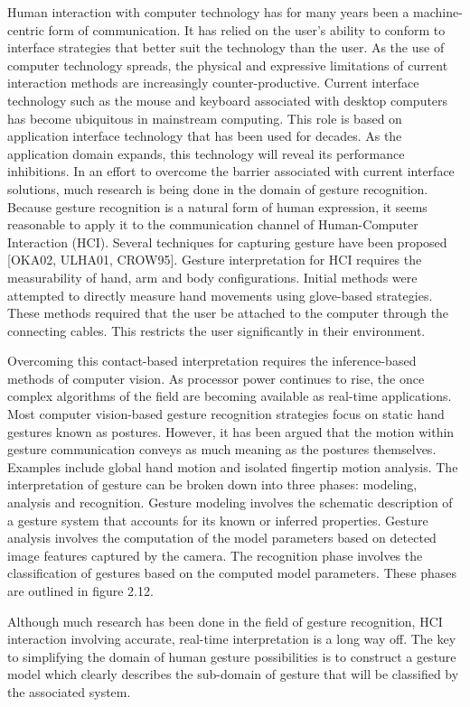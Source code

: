 Human interaction with computer technology has for many years been a machine-centric form of communication. It has relied on the user’s ability to conform to interface strategies that better suit the technology than the user. As the use of computer technology spreads, the physical and expressive limitations of current interaction methods are increasingly counter-productive. Current interface technology such as the mouse and keyboard associated with desktop computers has become ubiquitous in mainstream computing. This role is based on application interface technology that has been used for decades. As the application domain expands, this technology will reveal its performance inhibitions. In an effort to overcome the barrier associated with current interface solutions, much research is being done in the domain of gesture recognition. Because gesture recognition is a natural form of human expression, it seems reasonable to apply it to the communication channel of Human-Computer Interaction (HCI). Several techniques for capturing gesture have been proposed [OKA02, ULHA01, CROW95]. Gesture interpretation for HCI requires the measurability of hand, arm and body configurations. Initial methods were attempted to directly measure hand movements using glove-based strategies. These methods required that the user be attached to the computer through the connecting cables. This restricts the user significantly in their environment.

Overcoming this contact-based interpretation requires the inference-based methods of computer vision. As processor power continues to rise, the once complex algorithms of the field are becoming available as real-time applications. Most computer vision-based gesture recognition strategies focus on static hand gestures known as postures. However, it has been argued that the motion within gesture communication conveys as much meaning as the postures themselves. Examples include global hand motion and isolated fingertip motion analysis. The interpretation of gesture can be broken down into three phases: modeling, analysis and recognition. Gesture modeling involves the schematic description of a gesture system that accounts for its known or inferred properties. Gesture analysis involves the computation of the model parameters based on detected image features captured by the camera. The recognition phase involves the classification of gestures based on the computed model parameters. These phases are outlined in figure 2.12.

Although much research has been done in the field of gesture recognition, HCI interaction involving accurate, real-time interpretation is a long way off. The key to simplifying the domain of human gesture possibilities is to construct a gesture model which clearly describes the sub-domain of gesture that will be classified by the associated system.



